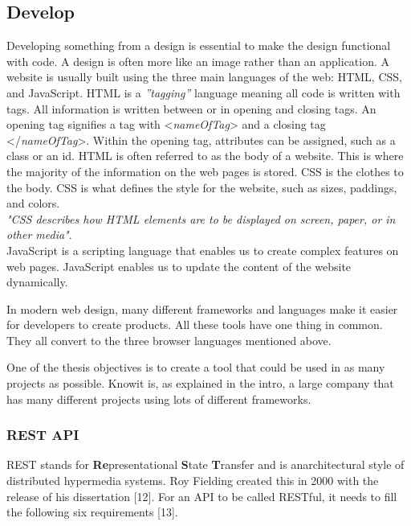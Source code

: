 \subsection{Develop}%
\label{sub:Develop}

Developing something from a design is essential to make the design functional with code. A design is often more like an image rather than an application. A website is usually built using the three main languages of the web: HTML, CSS, and JavaScript. HTML is a \textit{''tagging''} language meaning all code is written with tags. All information is written between or in opening and closing tags. An opening tag signifies a tag with  <\textit{nameOfTag}> and a closing tag </\textit{nameOfTag}>. Within the opening tag, attributes can be assigned, such as a class or an id. 
HTML is often referred to as the body of a website. This is where the majority of the information on the web pages is stored. CSS is the clothes to the body. CSS is what defines the style for the website, such as sizes, paddings, and colors.\\
\textit{"CSS describes how HTML elements are to be displayed on screen, paper, or in other media"}\cite{CSSIntroduction}.\\
JavaScript is a scripting language that enables us to create complex features on web pages. JavaScript enables us to update the content of the website dynamically. 

In modern web design, many different frameworks and languages make it easier for developers to create products.  All these tools have one thing in common. They all convert to the three browser languages mentioned above. 

One of the thesis objectives is to create a tool that could be used in as many projects as possible. Knowit is, as explained in the intro, a large company that has many different projects using lots of different frameworks. 


\subsubsection{REST API}%
\label{sub:REST API}
REST stands for \textbf{Re}presentational \textbf{S}tate \textbf{T}ransfer and is anarchitectural style of distributed hypermedia systems. Roy Fielding created this in 2000 with the release of his dissertation [12]. For an API to be called RESTful, it needs to fill the following six requirements [13]. 

